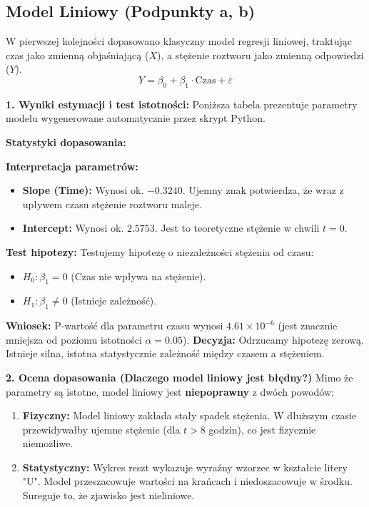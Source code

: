 \documentclass[12pt, a4paper]{article}
\begin{document}
\subsection{Model Liniowy (Podpunkty a, b)}
W pierwszej kolejności dopasowano klasyczny model regresji liniowej, traktując czas jako zmienną objaśniającą ($X$), a stężenie roztworu jako zmienną odpowiedzi ($Y$).
\begin{equation}
Y = \beta_0 + \beta_1 \cdot \text{Czas} + \varepsilon
\end{equation}

\textbf{1. Wyniki estymacji i test istotności:}
Poniższa tabela prezentuje parametry modelu wygenerowane automatycznie przez skrypt Python.


\textbf{Statystyki dopasowania:}


\textbf{Interpretacja parametrów:}
\begin{itemize}
    \item \textbf{Slope (Time):} Wynosi ok. $-0.3240$. Ujemny znak potwierdza, że wraz z upływem czasu stężenie roztworu maleje.
    \item \textbf{Intercept:} Wynosi ok. $2.5753$. Jest to teoretyczne stężenie w chwili $t=0$.
\end{itemize}

\textbf{Test hipotezy:}
Testujemy hipotezę o niezależności stężenia od czasu:
\begin{itemize}
    \item $H_0: \beta_1 = 0$ (Czas nie wpływa na stężenie).
    \item $H_1: \beta_1 \neq 0$ (Istnieje zależność).
\end{itemize}

\textbf{Wniosek:}
P-wartość dla parametru czasu wynosi $4.61 \times 10^{-6}$ (jest znacznie mniejsza od poziomu istotności $\alpha = 0.05$).
\textbf{Decyzja:} Odrzucamy hipotezę zerową. Istnieje silna, istotna statystycznie zależność między czasem a stężeniem.

\textbf{2. Ocena dopasowania (Dlaczego model liniowy jest błędny?)}
Mimo że parametry są istotne, model liniowy jest \textbf{niepoprawny} z dwóch powodów:
\begin{enumerate}
    \item \textbf{Fizyczny:} Model liniowy zakłada stały spadek stężenia. W dłuższym czasie przewidywałby ujemne stężenie (dla $t > 8$ godzin), co jest fizycznie niemożliwe.
    \item \textbf{Statystyczny:} Wykres reszt wykazuje wyraźny wzorzec w kształcie litery "U". Model przeszacowuje wartości na krańcach i niedoszacowuje w środku. Sureguje to, że zjawisko jest nieliniowe.
\end{enumerate}
\end{document}
